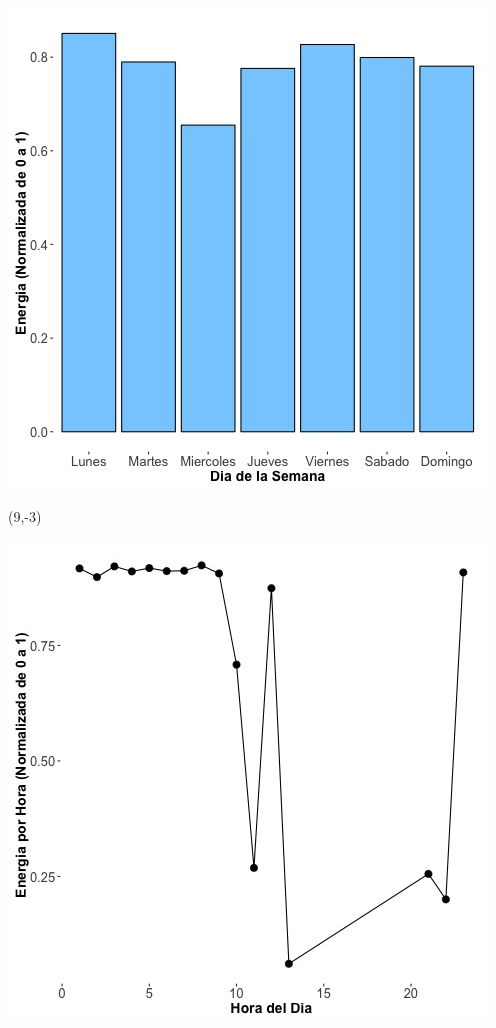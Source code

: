 \documentclass{article}\usepackage[]{graphicx}\usepackage[]{color}
\newenvironment{knitrout}{}{} %
\begin{document}
\begin{knitrout}
\color{fgcolor}
\includegraphics[scale=0.65]{figure/A17_day_of_week_plot} 
\end{knitrout}


 \begin{textblock}{1}(9,-3)
\begin{minipage}{20em}
\begingroup

\endgroup
\end{minipage}
\end{textblock}

 \vspace{2cm}

\begin{knitrout}
\color{fgcolor}
\includegraphics[scale=0.75]{figure/A17_fplot_norm_median} 
\end{knitrout}
\end{document}
